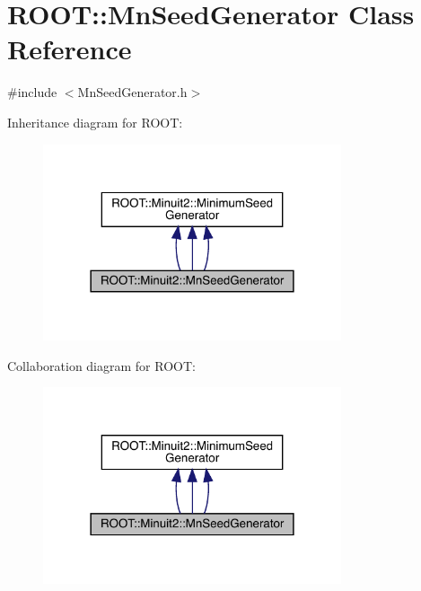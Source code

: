 \hypertarget{classROOT_1_1Minuit2_1_1MnSeedGenerator}{}\section{R\+O\+OT\+:\+:Mn\+Seed\+Generator Class Reference}
\label{classROOT_1_1Minuit2_1_1MnSeedGenerator}


{\ttfamily \#include $<$Mn\+Seed\+Generator.\+h$>$}



Inheritance diagram for R\+O\+OT\+:
\nopagebreak
\begin{figure}[H]
\begin{center}
\leavevmode
\includegraphics[width=249pt]{da/d9c/classROOT_1_1Minuit2_1_1MnSeedGenerator__inherit__graph}
\end{center}
\end{figure}


Collaboration diagram for R\+O\+OT\+:
\nopagebreak
\begin{figure}[H]
\begin{center}
\leavevmode
\includegraphics[width=249pt]{d1/d92/classROOT_1_1Minuit2_1_1MnSeedGenerator__coll__graph}
\end{center}
\end{figure}
